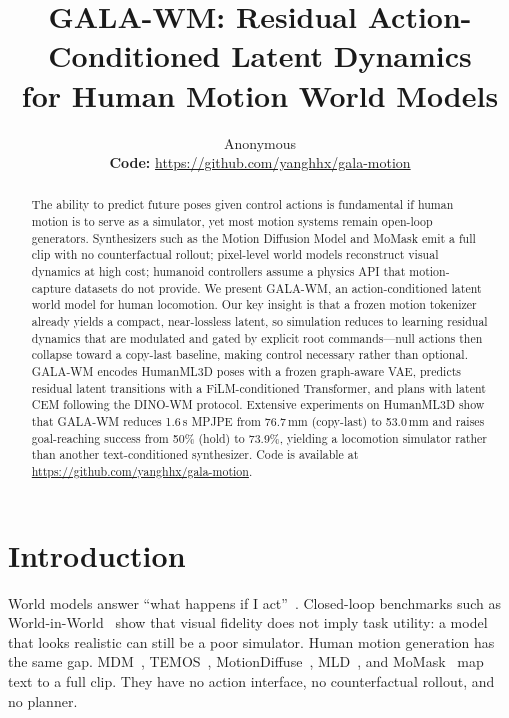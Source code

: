 \documentclass[10pt,twocolumn]{article}
\title{\vspace{-0.5em}GALA-WM: Residual Action-Conditioned Latent Dynamics\\for Human Motion World Models}
\author{Anonymous\\[2pt]
\small\textbf{Code:} \url{https://github.com/yanghhx/gala-motion}}
\date{}
\begin{document}
\maketitle
\vspace{-0.9em}

\begin{abstract}
\vspace{-0.2em}
The ability to predict future poses given control actions is fundamental if human motion is to serve as a simulator, yet most motion systems remain open-loop generators.
Synthesizers such as the Motion Diffusion Model and MoMask emit a full clip with no counterfactual rollout; pixel-level world models reconstruct visual dynamics at high cost; humanoid controllers assume a physics API that motion-capture datasets do not provide.
We present GALA-WM, an action-conditioned latent world model for human locomotion.
Our key insight is that a frozen motion tokenizer already yields a compact, near-lossless latent, so simulation reduces to learning residual dynamics that are modulated and gated by explicit root commands---null actions then collapse toward a copy-last baseline, making control necessary rather than optional.
GALA-WM encodes HumanML3D poses with a frozen graph-aware VAE, predicts residual latent transitions with a FiLM-conditioned Transformer, and plans with latent CEM following the DINO-WM protocol.
Extensive experiments on HumanML3D show that GALA-WM reduces 1.6\,s MPJPE from 76.7\,mm (copy-last) to 53.0\,mm and raises goal-reaching success from 50\% (hold) to 73.9\%, yielding a locomotion simulator rather than another text-conditioned synthesizer.
Code is available at \url{https://github.com/yanghhx/gala-motion}.
\vspace{-0.3em}
\end{abstract}

\section{Introduction}

World models answer ``what happens if I act''~\cite{ha2018world,hafner2025dreamerv3,lecun2022path}.
Closed-loop benchmarks such as World-in-World~\cite{zhang2026worldinworld} show that visual fidelity does not imply task utility: a model that looks realistic can still be a poor simulator.
Human motion generation has the same gap.
MDM~\cite{tevet2023mdm}, TEMOS~\cite{petrovich2022temos}, MotionDiffuse~\cite{zhang2024motiondiffuse}, MLD~\cite{chen2023executing}, and MoMask~\cite{guo2024momask} map text to a full clip.
They have no action interface, no counterfactual rollout, and no planner.
\end{document}
